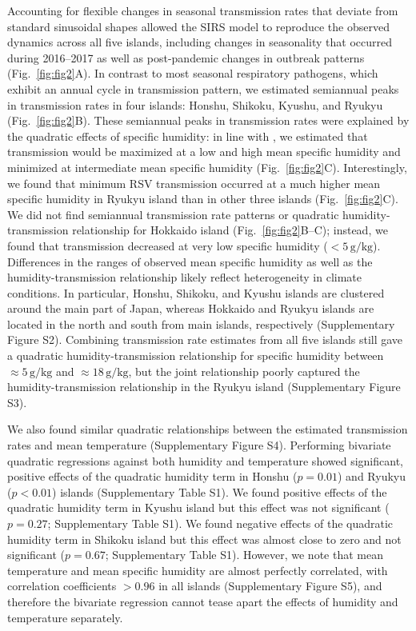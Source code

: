 \documentclass[12pt]{article}
\newcommand{\fref}[1]{Fig.~\ref{fig:#1}}
\begin{document}
Accounting for flexible changes in seasonal transmission rates that deviate from standard sinusoidal shapes allowed the SIRS model to reproduce the observed dynamics across all five islands, including changes in seasonality that occurred during 2016--2017 as well as post-pandemic changes in outbreak patterns (\fref{fig2}A).
In contrast to most seasonal respiratory pathogens, which exhibit an annual cycle in transmission pattern, we estimated semiannual peaks in transmission rates in four islands: Honshu, Shikoku, Kyushu, and Ryukyu (\fref{fig2}B).
These semiannual peaks in transmission rates were explained by the quadratic effects of specific humidity:
in line with \cite{baker2019epidemic}, we estimated that transmission would be maximized at a low and high mean specific humidity and minimized at intermediate mean specific humidity (\fref{fig2}C).
Interestingly, we found that minimum RSV transmission occurred at a much higher mean specific humidity in Ryukyu island than in other three islands (\fref{fig2}C).
We did not find semiannual transmission rate patterns or quadratic humidity-transmission relationship for Hokkaido island (\fref{fig2}B--C);
instead, we found that transmission decreased at very low specific humidity ($<5\,\mathrm{g/kg}$).
Differences in the ranges of observed mean specific humidity as well as the humidity-transmission relationship likely reflect heterogeneity in climate conditions.
In particular, Honshu, Shikoku, and Kyushu islands are clustered around the main part of Japan, whereas Hokkaido and Ryukyu islands are located in the north and south from main islands, respectively (Supplementary Figure S2).
Combining transmission rate estimates from all five islands still gave a quadratic humidity-transmission relationship for specific humidity between $\approx 5\,\mathrm{g/kg}$ and $\approx18\,\mathrm{g/kg}$, but the joint relationship poorly captured the humidity-transmission relationship in the Ryukyu island (Supplementary Figure S3).

We also found similar quadratic relationships between the estimated transmission rates and mean temperature (Supplementary Figure S4).
Performing bivariate quadratic regressions against both humidity and temperature showed significant, positive effects of the quadratic humidity term in Honshu ($p=0.01$) and Ryukyu ($p<0.01$) islands (Supplementary Table S1).
We found positive effects of the quadratic humidity term in Kyushu island but this effect was not significant ($p=0.27$; Supplementary Table S1).
We found negative effects of the quadratic humidity term in Shikoku island but this effect was almost close to zero and not significant ($p=0.67$; Supplementary Table S1).
However, we note that mean temperature and mean specific humidity are almost perfectly correlated, with correlation coefficients $>0.96$ in all islands (Supplementary Figure S5), and therefore the bivariate regression cannot tease apart the effects of humidity and temperature separately.
\end{document}
